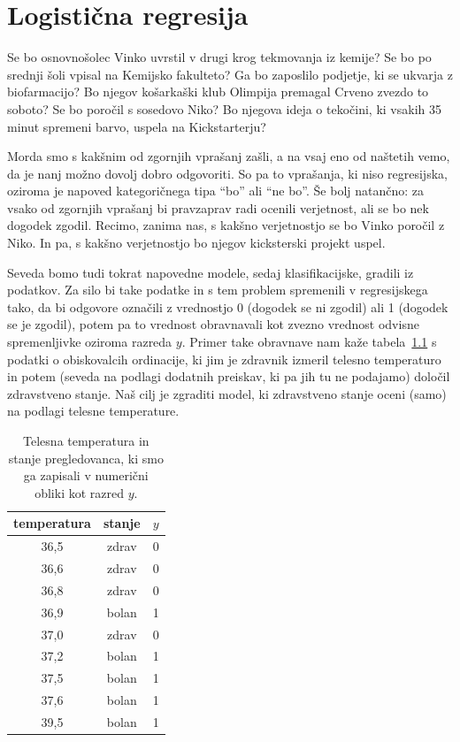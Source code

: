 \chapter{Logistična regresija}

Se bo osnovnošolec Vinko uvrstil v drugi krog tekmovanja iz kemije? Se bo po srednji šoli vpisal na Kemijsko fakulteto? Ga bo zaposlilo podjetje, ki se ukvarja z biofarmacijo? Bo njegov košarkaški klub Olimpija premagal Crveno zvezdo to soboto? Se bo poročil s sosedovo Niko? Bo njegova ideja o tekočini, ki vsakih 35 minut spremeni barvo, uspela na Kickstarterju?

Morda smo s kakšnim od zgornjih vprašanj zašli, a na vsaj eno od naštetih vemo, da je nanj možno dovolj dobro odgovoriti. So pa to vprašanja, ki niso regresijska, oziroma je napoved kategoričnega tipa ``bo'' ali ``ne bo''. Še bolj natančno: za vsako od zgornjih vprašanj bi pravzaprav radi ocenili verjetnost, ali se bo nek dogodek zgodil. Recimo, zanima nas, s kakšno verjetnostjo se bo Vinko poročil z Niko. In pa, s kakšno verjetnostjo bo njegov kicksterski projekt uspel.

Seveda bomo tudi tokrat napovedne modele, sedaj klasifikacijske, gradili iz podatkov. Za silo bi take podatke in s tem problem spremenili v regresijskega tako, da bi odgovore označili z vrednostjo 0 (dogodek se ni zgodil) ali 1 (dogodek se je zgodil), potem pa to vrednost obravnavali kot zvezno vrednost odvisne spremenljivke oziroma razreda $y$. Primer take obravnave nam kaže tabela~\ref{f:temperatura} s podatki o obiskovalcih ordinacije, ki jim je zdravnik izmeril telesno temperaturo in potem (seveda na podlagi dodatnih preiskav, ki pa jih tu ne podajamo) določil zdravstveno stanje. Naš cilj je zgraditi model, ki zdravstveno stanje oceni (samo) na podlagi telesne temperature.

\begin{table}[htbp]
\caption{Telesna temperatura in stanje pregledovanca, ki smo ga zapisali v numerični obliki kot razred $y$.}
\label{f:temperatura}
\begin{center}
\begin{tabular}{ccc}
\toprule
temperatura & stanje & $y$ \\
\midrule
36,5 & zdrav & 0 \\
36,6 & zdrav & 0 \\
36,8 & zdrav & 0 \\
36,9 & bolan & 1 \\
37,0 & zdrav & 0 \\
37,2 & bolan & 1 \\
37,5 & bolan & 1 \\
37,6 & bolan & 1 \\
39,5 & bolan & 1 \\
\bottomrule
\end{tabular}
\end{center}
\end{table}

